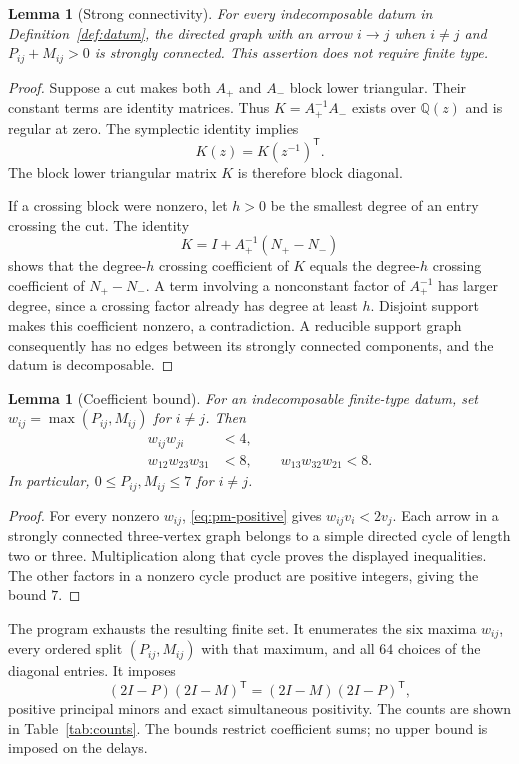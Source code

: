 \documentclass[11pt,a4paper]{article}
\newtheorem{lemma}[theorem]{Lemma}
\theoremstyle{definition}
\newcommand{\Q}{\mathbb Q}
\newcommand{\code}[1]{\texttt{\detokenize{#1}}}
\begin{document}
\begin{lemma}[Strong connectivity]\label{lem:strong}
For every indecomposable datum in Definition~\ref{def:datum}, the directed
graph with an arrow $i\to j$ when $i\ne j$ and $P_{ij}+M_{ij}>0$ is strongly
connected. This assertion does not require finite type.
\end{lemma}
\begin{proof}
Suppose a cut makes both $A_+$ and $A_-$ block lower triangular. Their
constant terms are identity matrices. Thus $K=A_+^{-1}A_-$ exists over
$\Q(z)$ and is regular at zero. The symplectic identity implies
\[
 K(z)=K(z^{-1})^{\mathsf T}.
\]
The block lower triangular matrix $K$ is therefore block diagonal.

If a crossing block were nonzero, let $h>0$ be the smallest degree of
an entry crossing the cut. The identity
\[
 K=I+A_+^{-1}(N_+-N_-)
\]
shows that the degree-$h$ crossing coefficient of $K$ equals the degree-$h$
crossing coefficient of $N_+-N_-$. A term involving a nonconstant factor
of $A_+^{-1}$ has larger degree, since a crossing factor already has degree
at least $h$. Disjoint support makes this coefficient nonzero, a
contradiction. A reducible support graph consequently has no edges between
its strongly connected components, and the datum is decomposable.
\end{proof}

\begin{lemma}[Coefficient bound]\label{lem:bound}
For an indecomposable finite-type datum, set
$w_{ij}=\max(P_{ij},M_{ij})$ for $i\ne j$. Then
\begin{align}
 w_{ij}w_{ji}&<4,\label{eq:two-cycle}\\
 w_{12}w_{23}w_{31}&<8,\qquad w_{13}w_{32}w_{21}<8.\label{eq:three-cycle}
\end{align}
In particular, $0\le P_{ij},M_{ij}\le7$ for $i\ne j$.
\end{lemma}
\begin{proof}
For every nonzero $w_{ij}$, \eqref{eq:pm-positive} gives
$w_{ij}v_i<2v_j$. Each arrow in a strongly connected three-vertex graph
belongs to a simple directed cycle of length two or three. Multiplication
along that cycle proves the displayed inequalities. The other factors in
a nonzero cycle product are positive integers, giving the bound $7$.
\end{proof}

The program \code{enumerate_constants.py} exhausts the resulting finite
set. It enumerates the six maxima $w_{ij}$, every ordered split
$(P_{ij},M_{ij})$ with that maximum, and all $64$ choices of the diagonal
entries. It imposes
\[
 (2I-P)(2I-M)^{\mathsf T}=(2I-M)(2I-P)^{\mathsf T},
\]
positive principal minors and exact simultaneous positivity. The counts are
shown in Table~\ref{tab:counts}. The bounds restrict coefficient sums;
no upper bound is imposed on the delays.
\end{document}
